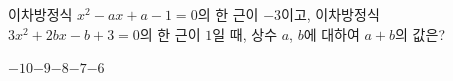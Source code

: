 이차방정식 $x^2-ax+a-1=0$의 한 근이 $-3$이고, 이차방정식 $3x^2+2bx-b+3=0$의 한 근이 $1$일 때, 상수 $a$, $b$에 대하여 $a+b$의 값은?
\begin{choices32}{$-10$}{$-9$}{$-8$}{$-7$}{$-6$}\end{choices32}
